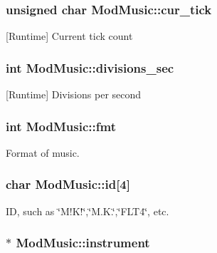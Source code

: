 \subsubsection[{cur\+\_\+tick}]{\setlength{\rightskip}{0pt plus 5cm}unsigned char Mod\+Music\+::cur\+\_\+tick}\label{structModMusic_a34dae5fc4930940b0cda5fd44467c751}


\mbox{[}Runtime\mbox{]} Current tick count 

\hypertarget{structModMusic_a64991ec01bd181942a99411e69713571}{}
\subsubsection[{divisions\+\_\+sec}]{\setlength{\rightskip}{0pt plus 5cm}int Mod\+Music\+::divisions\+\_\+sec}\label{structModMusic_a64991ec01bd181942a99411e69713571}


\mbox{[}Runtime\mbox{]} Divisions per second 

\hypertarget{structModMusic_a8333fbe2d5747ef9397d371886d00a5c}{}
\subsubsection[{fmt}]{\setlength{\rightskip}{0pt plus 5cm}int Mod\+Music\+::fmt}\label{structModMusic_a8333fbe2d5747ef9397d371886d00a5c}


Format of music. 

\hypertarget{structModMusic_a5c5d6cb058ca58e045eb51e0b036b3fb}{}
\subsubsection[{id}]{\setlength{\rightskip}{0pt plus 5cm}char Mod\+Music\+::id\mbox{[}4\mbox{]}}\label{structModMusic_a5c5d6cb058ca58e045eb51e0b036b3fb}


I\+D, such as \char`\"{}\+M!\+K!\char`\"{},\char`\"{}\+M.\+K.\char`\"{},\char`\"{}\+F\+L\+T4\char`\"{}, etc. 

\hypertarget{structModMusic_a6683f3be02e56150252cdda5caa3dc9b}{}
\subsubsection[{instrument}]{$\ast$ Mod\+Music\+::instrument}\label{structModMusic_a6683f3be02e56150252cdda5caa3dc9b}


